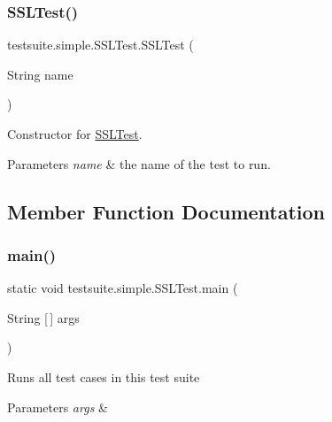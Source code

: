 \subsubsection{\texorpdfstring{S\+S\+L\+Test()}{SSLTest()}}
{\footnotesize\ttfamily testsuite.\+simple.\+S\+S\+L\+Test.\+S\+S\+L\+Test (\begin{DoxyParamCaption}\item[{String}]{name }\end{DoxyParamCaption})}

Constructor for \mbox{\hyperlink{classtestsuite_1_1simple_1_1_s_s_l_test}{S\+S\+L\+Test}}.


\begin{DoxyParams}{Parameters}
{\em name} & the name of the test to run. \\
\hline
\end{DoxyParams}


\subsection{Member Function Documentation}
\mbox{\label{classtestsuite_1_1simple_1_1_s_s_l_test_a0435dcfc4b0a69d7653db1f50647ce9f}} 
\subsubsection{\texorpdfstring{main()}{main()}}
{\footnotesize\ttfamily static void testsuite.\+simple.\+S\+S\+L\+Test.\+main (\begin{DoxyParamCaption}\item[{String \mbox{[}$\,$\mbox{]}}]{args }\end{DoxyParamCaption})\hspace{0.3cm}{\ttfamily [static]}}

Runs all test cases in this test suite


\begin{DoxyParams}{Parameters}
{\em args} & \\
\hline
\end{DoxyParams}
\mbox{\label{classtestsuite_1_1simple_1_1_s_s_l_test_ad9e62b989cd5424f9ca3995f9bea794a}} 
